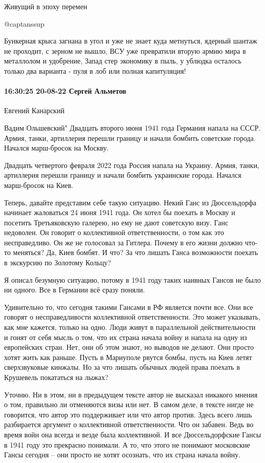 Живущий в эпоху перемен

@captanssup

Бункерная крыса загнана в угол и уже не знает куда метнуться, ядерный шантаж не проходит, с зерном не вышло, ВСУ уже превратили вторую армию мира в металлолом и удобрение, Запад стер экономику в пыль, у ублюдка осталось только два варианта - пуля в лоб или полная капитуляция!

\paragraph{16:30:25 20-08-22 Сергей Альметов}

Евгений Канарский

Вадим Ольшевский" Двадцать второго июня 1941 года Германия напала на СССР.
Армия, танки, артиллерия перешли границу и начали бомбить советские города.
Начался марш-бросок на Москву.

Двадцать четвертого февраля 2022 года Россия напала на Украину. Армия, танки, артиллерия перешли границу и начали бомбить украинские города. Начался марш-бросок на Киев.

Теперь, давайте представим себе такую ситуацию. Некий Ганс из Дюссельдорфа
начинает жаловаться 24 июня 1941 года. Он хотел бы поехать в Москву и посетить
Третьяковскую галерею, но ему не дают советскую визу. Ганс недоволен. Он
говорит о коллективной ответственности, о том как это несправедливо. Он же не
голосовал за Гитлера. Почему в его жизни должно что-то меняться? Да, Киев
бомбят. И что? За что лишать Ганса возможности поехать в экскурсию по Золотому
Кольцу?

Я описал безумную ситуацию, потому в 1941 году таких наивных Гансов не было ни
одного. Все в Германии всё сразу поняли.

Удивительно то, что сегодня такими Гансами в РФ является почти все. Они все
говорят о несправедливости коллективной ответственности. Это может указывать,
как мне кажется, только на одно. Люди живут в параллельной действительности и
гонят от себя мысль о том, что их страна начала войну и напала на одну из
европейских стран. Нет, они об этом знают, но выводов не делают. Они просто
хотят жить как раньше. Пусть в Мариуполе рвутся бомбы, пусть на Киев летят
сверхзвуковые кинжалы. Но за что лишать обычных людей права поехать в Крушевель
покататься на лыжах?

Уточню. Ни в этом, ни в предыдущем тексте автор не высказал никакого мнения о
том, правильно ли отменяются визы или нет. В самом деле, в тексте нигде не
говорится, что автор это поддерживает или что автор против. Здесь всего лишь
разбирается аргумент о коллективной ответственности. Что он забавен. Ведь во
время войн она всегда и везде была коллективной. И все Дюссельдорфские Гансы в
1941 году это прекрасно понимали. А то, что этого не понимают московские Гансы
сегодня – они просто не хотят осознать, что их страна начала войну.

